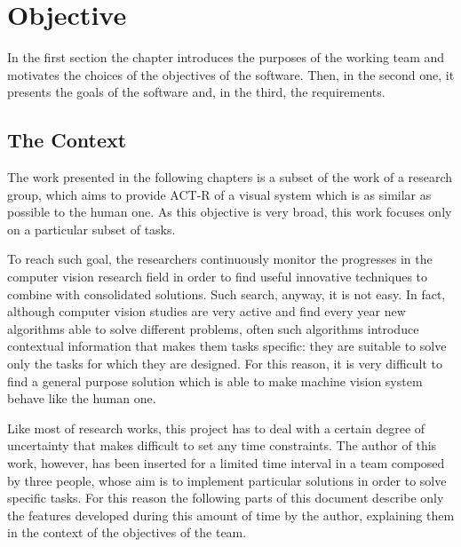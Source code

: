 \chapter{Objective}\label{chObjective}
	In the first section the chapter introduces the purposes of the working team and motivates the choices of the objectives of the software. Then, in the second one, it presents the goals of the software and, in the third, the requirements.
 

	\section{The Context}
	The work presented in the following chapters is a subset of the work of a research group, which aims to provide \mbox{ACT-R} of a visual system which is as similar as possible to the human one. 
	As this objective is very broad, this work focuses only on a particular subset of tasks.


	To reach such goal, the researchers continuously monitor the progresses in the computer vision research field in order to find useful innovative techniques to combine with consolidated solutions. 
	Such search, anyway, it is not easy. In fact, although computer vision studies are very active and find every year new algorithms able to solve different problems, often such algorithms introduce contextual information that makes them tasks specific: they are suitable to solve only the tasks for which they are designed. 
	For this reason, it is very difficult to find a general purpose solution which is able to make machine vision system behave like the human one.


	Like most of research works, this project has to deal with a certain degree of uncertainty that makes difficult to set any time constraints.
	The author of this work, however, has been inserted for a limited time interval in a team composed by three people, whose aim is to implement particular solutions in order to solve specific tasks. 
	For this reason the following parts of this document describe only the features developed during this amount of time by the author, explaining them in the context of the objectives of the team. 
	
